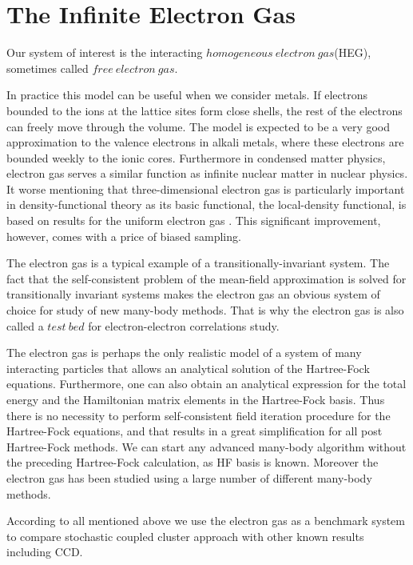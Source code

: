 \documentclass[twoside,english]{uiofysmaster}
\begin{document}
\chapter{The Infinite Electron Gas}

Our system of interest is the interacting $homogeneous\ electron\ gas$(HEG), sometimes called $free\ electron\ gas$. 

In practice this model can be useful when we consider metals. If electrons bounded to the ions at the lattice sites form close shells, the rest of the electrons can freely move through the volume. The model is expected to be a very good approximation to the valence electrons in alkali metals, where these electrons are bounded weekly to the ionic cores\cite{GrossManyparticletheory1991}.
Furthermore in condensed matter physics, electron gas serves a similar function as infinite nuclear matter in nuclear physics\cite{Hjorth-Jensenadvancedcoursecomputational2017}. It worse mentioning that three-dimensional electron gas is particularly important in density-functional theory as its basic functional, the local-density functional, is based on results for the uniform electron gas \cite{ShollDensityFunctionalTheory2009}. This significant improvement, however, comes with a price of biased sampling.


The electron gas is a typical example of a transitionally-invariant system. The fact that the self-consistent problem of the mean-field approximation is solved for transitionally invariant systems makes the electron gas an obvious system of choice for study of new many-body methods. That is why the electron gas is also called a $test\ bed$ for electron-electron correlations study. 


The electron gas is perhaps the only realistic model of a system of many interacting particles that allows an analytical solution of the Hartree-Fock equations. Furthermore, one can also obtain an analytical expression for the total energy and  the Hamiltonian matrix elements in the Hartree-Fock basis. Thus there is no necessity to perform self-consistent field iteration procedure for the Hartree-Fock equations, and that results in a great simplification for all post Hartree-Fock methods. We can start any advanced many-body algorithm without the preceding Hartree-Fock calculation, as HF basis is known.
Moreover the electron gas has been studied using a large number of different many-body methods. 

According to all mentioned above we use the electron gas as a benchmark system to compare stochastic coupled cluster approach with other known results including CCD.
\end{document}
